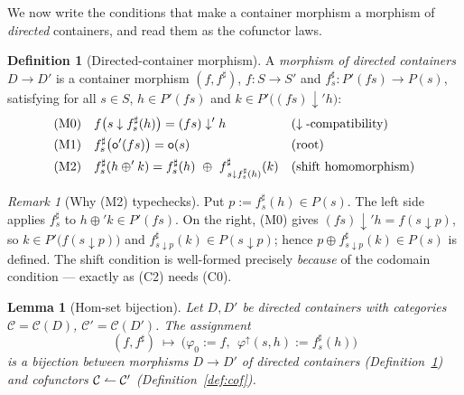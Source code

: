 \documentclass[11pt,a4paper]{amsart}
\newcommand{\co}{\mathrel{\text{\reflectbox{$\rightharpoonup$}}}}
\theoremstyle{plain}
\newtheorem{lemma}[theorem]{Lemma}
\theoremstyle{definition}
\newtheorem{definition}[theorem]{Definition}
\theoremstyle{remark}
\newtheorem{remark}[theorem]{Remark}
\begin{document}
We now write the conditions that make a container morphism a morphism of \emph{directed}
containers, and read them as the cofunctor laws.

\begin{definition}[Directed-container morphism]\label{def:dcm}
A \emph{morphism of directed containers} $D\to D'$ is a container morphism
$(f,f^\sharp)$, $f\colon S\to S'$ and $f^\sharp_s\colon P'(fs)\to P(s)$, satisfying for
all $s\in S$, $h\in P'(fs)$ and $k\in P'\big((fs)\downarrow' h\big)$:
\begin{align}
  \text{(M0)}\quad & f\big(s\downarrow f^\sharp_s(h)\big) = (fs)\downarrow' h
        && (\downarrow\text{-compatibility})\notag\\
  \text{(M1)}\quad & f^\sharp_s\big(\mathsf o'(fs)\big) = \mathsf o(s)
        && \text{(root)}\notag\\
  \text{(M2)}\quad & f^\sharp_s(h\oplus' k)
        = f^\sharp_s(h)\ \oplus\ f^\sharp_{\,s\downarrow f^\sharp_s(h)}(k)
        && \text{(shift homomorphism)}\notag
\end{align}
\end{definition}

\begin{remark}[Why (M2) typechecks]
Put $p:=f^\sharp_s(h)\in P(s)$. The left side applies $f^\sharp_s$ to
$h\oplus' k\in P'(fs)$. On the right, (M0) gives $(fs)\downarrow' h=f(s\downarrow p)$, so
$k\in P'\big(f(s\downarrow p)\big)$ and $f^\sharp_{s\downarrow p}(k)\in P(s\downarrow p)$;
hence $p\oplus f^\sharp_{s\downarrow p}(k)\in P(s)$ is defined. The shift condition is
well-formed precisely \emph{because} of the codomain condition --- exactly as (C2)
needs (C0).
\end{remark}

\begin{lemma}[Hom-set bijection]\label{lem:hom}
Let $D,D'$ be directed containers with categories $\mathcal C=\mathcal C(D)$,
$\mathcal C'=\mathcal C(D')$. The assignment
\[
  (f,f^\sharp)\ \longmapsto\
  \big(\varphi_0:=f,\ \ \varphi^\uparrow(s,h):=f^\sharp_s(h)\big)
\]
is a bijection between morphisms $D\to D'$ of directed containers
(Definition~\ref{def:dcm}) and cofunctors $\mathcal C\co\mathcal C'$
(Definition~\ref{def:cof}).
\end{lemma}
\end{document}
